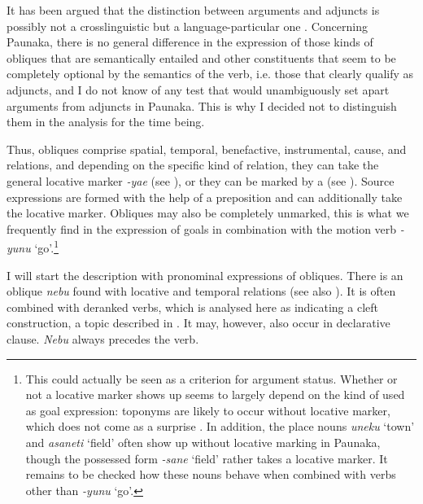 
It has been argued that the distinction between arguments and adjuncts is possibly not a crosslinguistic but a language-particular one \citep[]{Haspelmath2014}. Concerning Paunaka, there is no general difference in the expression of those kinds of obliques that are semantically entailed and other constituents that seem to be completely optional by the semantics of the verb, i.e. those that clearly qualify as adjuncts, and I do not know of any test that would unambiguously set apart arguments from adjuncts in Paunaka. This is why I decided not to distinguish them in the analysis for the time being.

Thus, obliques comprise spatial, temporal, benefactive, instrumental, cause, and  relations, and depending on the specific kind of relation, they can take the general locative marker \textit{-yae} (see ), or they can be marked by a  (see ). Source expressions are formed with the help of a preposition and can additionally take the locative marker. Obliques may also be completely unmarked, this is what we frequently find in the expression of goals in combination with the motion verb \textit{-yunu} ‘go’.\footnote{This could actually be seen as a criterion for argument status. Whether or not a locative marker shows up seems to largely depend on the kind of  used as goal expression: toponyms are likely to occur without locative marker, which does not come as a surprise \citep[cf.][291]{StolzAL2014}. In addition, the place nouns \textit{uneku} ‘town’ and \textit{asaneti} ‘field’ often show up without locative marking in Paunaka, though the possessed form \textit{-sane} ‘field’ rather takes a locative marker. It remains to be checked how these nouns behave when combined with verbs other than \textit{-yunu} ‘go’.}

I will start the description with pronominal expressions of obliques. There is an oblique  \textit{nebu} found with locative and temporal relations (see also ). It is often combined with deranked verbs, which is analysed here as indicating a cleft construction, a topic described in . It may, however, also occur in declarative clause. \textit{Nebu} always precedes the verb.

